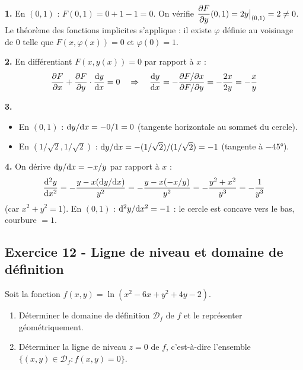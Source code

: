 \documentclass[12pt,a4paper]{article}
\begin{document}
\begin{boitecorrige}
\textbf{1.} En $(0,1)$ : $F(0,1) = 0+1-1 = 0$. On vérifie $\dfrac{\partial F}{\partial y}(0,1) = 2y\big|_{(0,1)} = 2\neq0$. Le théorème des fonctions implicites s'applique : il existe $\varphi$ définie au voisinage de 0 telle que $F(x,\varphi(x)) = 0$ et $\varphi(0) = 1$.

\textbf{2.} En différentiant $F(x,y(x)) = 0$ par rapport à $x$ :
\[
\dfrac{\partial F}{\partial x} + \dfrac{\partial F}{\partial y}\cdot\frac{\mathrm{d} y}{\mathrm{d} x} = 0 \quad\Rightarrow\quad \frac{\mathrm{d} y}{\mathrm{d} x} = -\frac{\partial F/\partial x}{\partial F/\partial y} = -\frac{2x}{2y} = -\frac{x}{y}
\]

\textbf{3.}
\begin{itemize}[nosep]
  \item En $(0,1)$ : $\mathrm{d} y/\mathrm{d} x = -0/1 = 0$ (tangente horizontale au sommet du cercle).
  \item En $(1/\sqrt{2}, 1/\sqrt{2})$ : $\mathrm{d} y/\mathrm{d} x = -(1/\sqrt{2})/(1/\sqrt{2}) = -1$ (tangente à $-45°$).
\end{itemize}

\textbf{4.} On dérive $\mathrm{d} y/\mathrm{d} x = -x/y$ par rapport à $x$ :
\[
\frac{\mathrm{d}^2y}{\mathrm{d} x^2} = -\frac{y - x(\mathrm{d} y/\mathrm{d} x)}{y^2} = -\frac{y - x(-x/y)}{y^2} = -\frac{y^2+x^2}{y^3} = -\frac{1}{y^3}
\]
(car $x^2+y^2=1$). En $(0,1)$ : $\mathrm{d}^2y/\mathrm{d} x^2 = -1$ : le cercle est concave vers le bas, courbure $= 1$.
\end{boitecorrige}

\subsection*{Exercice 12 - Ligne de niveau et domaine de définition \niveau{\moyen}}

\begin{boiteexercice}
Soit la fonction $f(x,y) = \ln\!\left(x^2 - 6x + y^2 + 4y - 2\right)$.
\begin{enumerate}
  \item Déterminer le domaine de définition $\mathcal{D}_f$ de $f$ et le représenter géométriquement.
  \item Déterminer la ligne de niveau $z = 0$ de $f$, c'est-à-dire l'ensemble $\{(x,y)\in\mathcal{D}_f : f(x,y) = 0\}$.
\end{enumerate}
\end{boiteexercice}
\end{document}
